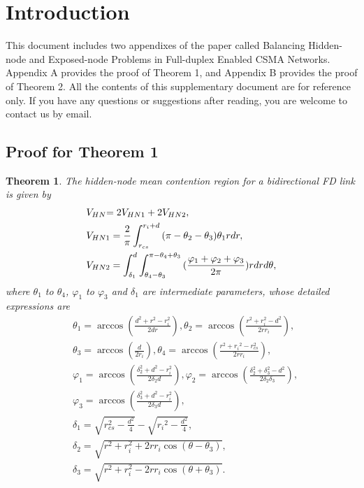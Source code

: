 \documentclass[conference]{IEEEtran}
\theoremstyle{plain}
\newtheorem{theorem}{Theorem}
\begin{document}
\section{Introduction}
This document includes two appendixes of the paper called Balancing Hidden-node and Exposed-node Problems in Full-duplex Enabled CSMA Networks. Appendix A provides the proof of Theorem 1, and Appendix B provides the proof of Theorem 2. All the contents of this supplementary document are for reference only. If you have any questions or suggestions after reading, you are welcome to contact us by email. 

\begin{appendices} 

\section{Proof for Theorem 1} 
\begin{theorem} \label{theorem_HNMCR}
	The hidden-node mean contention region for a bidirectional FD link is given by 
	\begin{align}
	\label{V_HN_total} &{V_{HN}}{\rm{ = 2}}{V_{HN1}} + {\rm{2}}{V_{HN2}}, \\
	\label{V_HN1} &{V_{HN1}} = \frac{2}{\pi }\int_{r_{cs}}^{{r_i} + d} {(\pi  - {\theta _2} - {\theta _3})} {\theta _1}rdr, \\
	\label{V_HN2} &{V_{HN2}} = \int_{{\delta _1}}^d {\int_{{\theta _4} - {\theta _3}}^{\pi  - {\theta _4} + {\theta _3}} {(\frac{{{\varphi _1} + {\varphi _2} + {\varphi _3}}}{{2\pi }})} } rdrd\theta, 
	\end{align}
	where $\theta_1$ to $\theta_4$, $\varphi _1$ to $\varphi _3$ and $\delta _1$ are intermediate parameters, whose detailed expressions are
	\begin{align*}
	&{\theta _1} = \arccos (\frac{{{d^2} + {r^2} - r_i^2}}{{2dr}}), {\theta _2} = \arccos (\frac{{{r^2} + {r_i^2} - d^2}}{{2rr_i}}), \\
	&{\theta _3} = \arccos (\frac{d}{{2{r_i}}}), {\theta _4} = \arccos (\frac{{{r^2} + {r_i}^2 - r_{cs}^2}}{{2r{r_i}}}), \\
	&{\varphi _1} = \arccos (\frac{{\delta _2^2 + {d^2} - r_i^2}}{{2{\delta _2}d}}), {\varphi _2} = \arccos (\frac{{\delta _2^2 + \delta _3^2 - {d^2}}}{{2{\delta _2}{\delta _3}}}), \\
	&{\varphi _3} = \arccos (\frac{{\delta _3^2 + {d^2} - r_i^2}}{{2{\delta _3}d}}),\\
	&{\delta _1} = \sqrt {r_{cs}^2 - \frac{{{d^2}}}{4}}  - \sqrt {{r_i}^2 - \frac{{{d^2}}}{4}},\\
	&{\delta _2} = \sqrt {{r^2} + r_i^2 + 2r{r_i}\cos (\theta  - {\theta _3})},\\
	&{\delta _3} = \sqrt {{r^2} + r_i^2 - 2r{r_i}\cos (\theta  + {\theta _3})}.
	\end{align*} 
\end{theorem}


\end{appendices}
\end{document}
